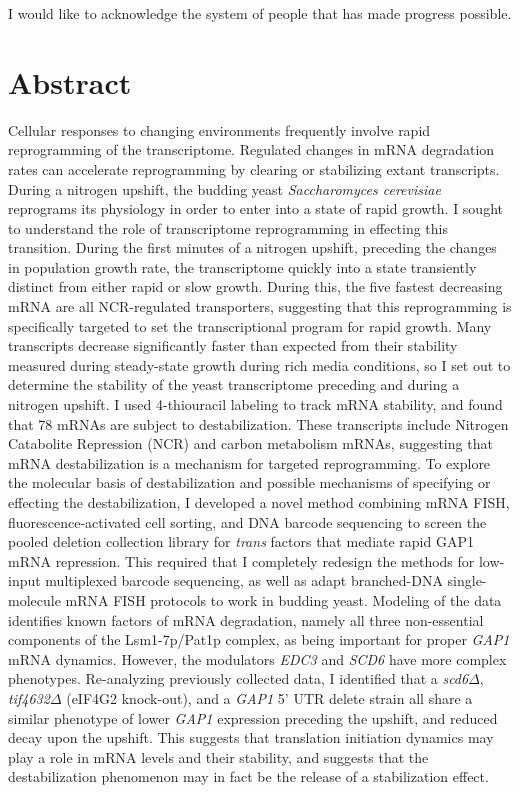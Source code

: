 \documentclass[12pt,letterpaper]{memoir}
\begin{document}
I would like to acknowledge the system of people that has made 
progress possible.

\fi

\newpage
\pagestyle{plain}

\section*{Abstract}

Cellular responses to changing environments frequently involve rapid
reprogramming of the transcriptome. Regulated
changes in mRNA degradation rates can accelerate reprogramming by
clearing or stabilizing extant transcripts. 
During a nitrogen upshift, the budding yeast \textit{Saccharomyces
cerevisiae} reprograms its physiology in order to enter into  
a state of rapid growth. 
I sought to understand the role of transcriptome reprogramming
in effecting this transition.
During the first minutes of a nitrogen upshift,
preceding the changes in population growth rate,
the transcriptome quickly into a state transiently distinct from
either rapid or slow growth.
During this, the five fastest decreasing mRNA are all NCR-regulated 
transporters, suggesting that this reprogramming is specifically
targeted to set the transcriptional program for rapid growth.
Many transcripts decrease significantly faster than expected from
their stability measured during steady-state growth during
rich media conditions, so I set out to determine the stability of
the yeast transcriptome preceding and during a nitrogen upshift.
I used 4-thiouracil labeling to track mRNA stability, and found 
that 78 mRNAs are subject to destabilization. 
These transcripts include
Nitrogen Catabolite Repression (NCR) and carbon metabolism mRNAs,
suggesting that mRNA destabilization is a mechanism for targeted
reprogramming. 
To explore the molecular basis of destabilization and possible
mechanisms of specifying or effecting the destabilization, I
developed a novel method combining mRNA FISH, fluorescence-activated
cell sorting, and DNA barcode sequencing to screen the pooled deletion
collection library for \textit{trans} factors that mediate rapid GAP1 mRNA
repression. This required that I completely redesign the methods for 
low-input multiplexed barcode sequencing, as well as adapt 
branched-DNA single-molecule mRNA FISH protocols to work in budding
yeast. Modeling of the data identifies known factors of mRNA
degradation, namely all three non-essential components of the
Lsm1-7p/Pat1p complex, as being important for proper \textit{GAP1}
mRNA dynamics. However, the modulators \textit{EDC3} and \textit{SCD6}
have more complex phenotypes. Re-analyzing previously collected data,
I identified that a \textit{scd6}$\Delta$, \textit{tif4632}$\Delta$
(eIF4G2 knock-out), and a \textit{GAP1} 5' UTR delete strain all
share a similar phenotype of lower \textit{GAP1} expression preceding
the upshift, and reduced decay upon the upshift. This suggests that 
translation initiation dynamics may play a role in mRNA levels and 
their stability, and suggests that the destabilization phenomenon 
may in fact be the release of a stabilization effect.
\end{document}
